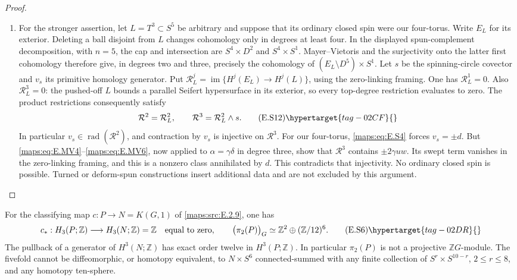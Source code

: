\begin{proof}
\begin{enumerate}[label={$\langle1\rangle$\arabic*.},leftmargin=*]
\item For the stronger assertion, let $L=T^3\subset S^5$ be arbitrary
and suppose that its ordinary closed spin were our four-torus.
Write $E_L$ for its exterior. Deleting a ball disjoint from
$L$ changes cohomology only in degrees at least four. In the
displayed spun-complement decomposition, with $n=5$, the cap
and intersection are $S^4\times D^2$ and $S^4\times S^1$.
Mayer--Vietoris and the surjectivity onto the latter first
cohomology therefore give, in degrees two and three, precisely
the cohomology of $(E_L\setminus D^5)\times S^1$.
Let $s$ be the spinning-circle covector and $v_s$ its primitive
homology generator. Put $\mathcal R_L^j=\operatorname{im}
\{H^j(E_L)\to H^j(L)\}$, using the zero-linking framing.
One has $\mathcal R_L^1=0$. Also $\mathcal R_L^3=0$:
the pushed-off $L$ bounds a parallel Seifert hypersurface in
its exterior, so every top-degree restriction evaluates to
zero. The product restrictions consequently satisfy
\[
       \mathcal R^2=\mathcal R_L^2,\qquad
       \mathcal R^3=\mathcal R_L^2\wedge s.
 \tag{E.S12}\hypertarget{tag-02CF}{}\label{maps:eq:E.S12}
\]
In particular $v_s\in\operatorname{rad}(\mathcal R^2)$,
and contraction by $v_s$ is injective on $\mathcal R^3$.
For our four-torus, \eqref{maps:eq:E.S4} forces $v_s=\pm d$.
But \eqref{maps:eq:E.MV4}--\eqref{maps:eq:E.MV6}, now applied to $\alpha=\gamma\delta$
in degree three, show that $\mathcal R^3$ contains
$\pm2\gamma uw$. Its swept term vanishes in the zero-linking
framing, and this is a nonzero class annihilated by $d$.
This contradicts that injectivity. No ordinary closed spin
is possible. Turned or deform-spun constructions insert
additional data and are not excluded by this argument.
\end{enumerate}
\end{proof}

\begin{theorem}\hypertarget{tag-02MB}{}\label{maps:src:E.2.11}


For the classifying map $c:P\to N=K(G,1)$ of \ref{maps:src:E.2.9}, one has
\[
 c_*:H_3(P;\mathbb Z)\longrightarrow H_3(N;\mathbb Z)=\mathbb Z
       \quad\text{equal to zero},
 \qquad
 \bigl(\pi_2(P)\bigr)_G
       \simeq\mathbb Z^2\oplus(\mathbb Z/12)^6.
 \tag{E.S6}\hypertarget{tag-02DR}{}\label{maps:eq:E.S6}
\]
The pullback of a generator of $H^3(N;\mathbb Z)$ has exact order
twelve in $H^3(P;\mathbb Z)$. In particular $\pi_2(P)$ is not a
projective $\mathbb ZG$-module. The fivefold cannot be diffeomorphic,
or homotopy equivalent, to $N\times S^6$ connected-summed with any
finite collection of $S^r\times S^{10-r}$, $2\leq r\leq8$, and
any homotopy ten-sphere. \end{theorem}


